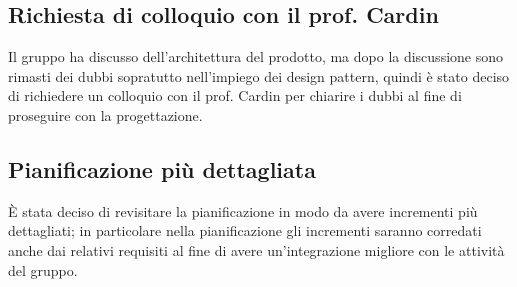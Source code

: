 \subsection{Richiesta di colloquio con il prof. Cardin}
Il gruppo ha discusso dell'architettura del prodotto\glosp, ma dopo la discussione sono rimasti dei dubbi sopratutto nell'impiego dei design pattern, quindi è stato deciso di richiedere un colloquio con il prof. Cardin per chiarire i dubbi al fine di proseguire con la progettazione.

\subsection{Pianificazione più dettagliata}
È stata deciso di revisitare la pianificazione in modo da avere incrementi più dettagliati; in particolare nella pianificazione gli incrementi saranno corredati anche dai relativi requisiti al fine di avere un'integrazione migliore con le attività del gruppo.
